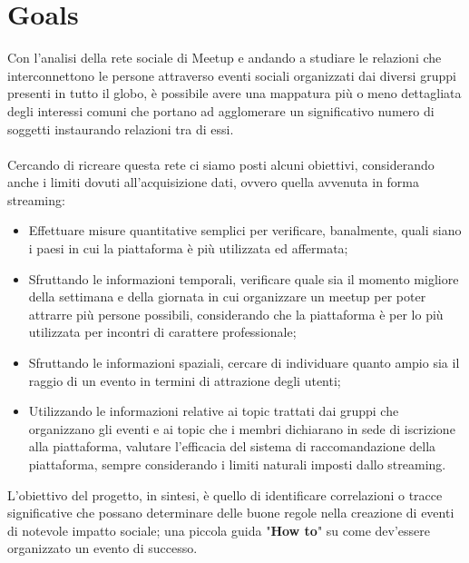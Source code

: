 \documentclass[fleqn,10pt]{SelfArx} %
\begin{document}
\section{Goals}
{\small
Con l'analisi della rete sociale di Meetup e andando a studiare le relazioni che interconnettono le persone attraverso eventi sociali organizzati dai diversi gruppi presenti in tutto il globo, è possibile avere una mappatura più o meno dettagliata degli interessi comuni che portano ad agglomerare un significativo numero di soggetti instaurando relazioni tra di essi. \\
\\
Cercando di ricreare questa rete ci siamo posti alcuni obiettivi, considerando anche i limiti dovuti all'acquisizione dati, ovvero quella avvenuta in forma streaming:
\begin{itemize}
\item Effettuare misure quantitative semplici per verificare, banalmente, quali siano i paesi in cui la piattaforma è più utilizzata ed affermata;
\item Sfruttando le informazioni temporali, verificare quale sia il momento migliore della settimana e della giornata in cui organizzare un meetup per poter attrarre più persone possibili, considerando che la piattaforma è per lo più utilizzata per incontri di carattere professionale;
\item Sfruttando le informazioni spaziali, cercare di individuare quanto ampio sia il raggio di un evento in termini di attrazione degli utenti;
\item Utilizzando le informazioni relative ai topic trattati dai gruppi che organizzano gli eventi e ai topic che i membri dichiarano in sede di iscrizione alla piattaforma, valutare l'efficacia del sistema di raccomandazione della piattaforma, sempre considerando i limiti naturali imposti dallo streaming.
\end{itemize}
L'obiettivo del progetto, in sintesi, è quello di identificare correlazioni o tracce significative che possano determinare delle buone regole nella creazione di eventi di notevole impatto sociale; una piccola guida "\textbf{How to}" su come dev'essere organizzato un evento di successo.
}
\end{document}
